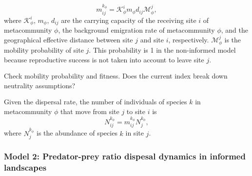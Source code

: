 \begin{equation}
  m^{k_{\phi}}_{ij} = \mathcal{K}^{i}_{\phi} m_{\phi} d_{ij} \mathcal{M}^{j}_{\phi},
\end{equation}
where $\mathcal{K}^{i}_{\phi}$, $m_{\phi}$, $d_{ij}$ are the carrying
capacity of the receiving site $i$ of metacommunity $\phi$, the
background emigration rate of metacommunity $\phi$, and the
geographical effective distance between site $j$ and site $i$,
respectively. $\mathcal{M}^{j}_{\phi}$ is the mobility probability of
site $j$. This probability is 1 in the non-informed model because
reproductive success is not taken into account to leave site $j$. 


Check mobility probability and fitness. Does the current index break down neutrality assumptions?

Given the dispersal rate, the number of individuals of species $k$ in
metacommunity $\phi$ that move from site $j$ to site $i$ is
\begin{equation}
  N^{k_{\phi}}_{ij} =  m^{k_{\phi}}_{ij}  N^{k_{\phi}}_{j},
\end{equation}
where $N^{k_{\phi}}_{j}$ is the abundance of species $k$ in site $j$.




\subsubsection{Model 2: Predator-prey ratio dispesal dynamics in informed landscapes}

